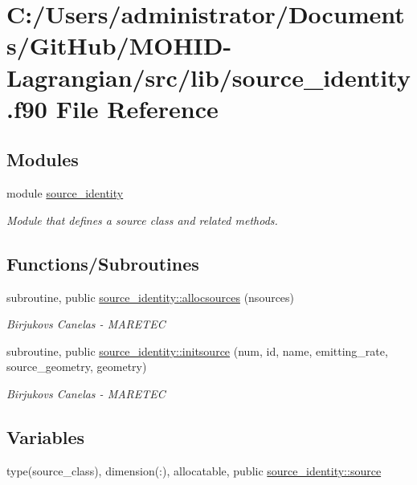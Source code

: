 \hypertarget{source__identity_8f90}{}\section{C\+:/\+Users/administrator/\+Documents/\+Git\+Hub/\+M\+O\+H\+I\+D-\/\+Lagrangian/src/lib/source\+\_\+identity.f90 File Reference}
\label{source__identity_8f90}
\subsection*{Modules}
\begin{DoxyCompactItemize}
\item 
module \mbox{\hyperlink{namespacesource__identity}{source\+\_\+identity}}
\begin{DoxyCompactList}\small\item\em Module that defines a source class and related methods. \end{DoxyCompactList}\end{DoxyCompactItemize}
\subsection*{Functions/\+Subroutines}
\begin{DoxyCompactItemize}
\item 
subroutine, public \mbox{\hyperlink{namespacesource__identity_a716b4cb4acec5756a6d4dcf20eee588e}{source\+\_\+identity\+::allocsources}} (nsources)
\begin{DoxyCompactList}\small\item\em Birjukovs Canelas -\/ M\+A\+R\+E\+T\+EC \end{DoxyCompactList}\item 
subroutine, public \mbox{\hyperlink{namespacesource__identity_a3939e59172252d0edce57e00ea41758d}{source\+\_\+identity\+::initsource}} (num, id, name, emitting\+\_\+rate, source\+\_\+geometry, geometry)
\begin{DoxyCompactList}\small\item\em Birjukovs Canelas -\/ M\+A\+R\+E\+T\+EC \end{DoxyCompactList}\end{DoxyCompactItemize}
\subsection*{Variables}
\begin{DoxyCompactItemize}
\item 
type(source\+\_\+class), dimension(\+:), allocatable, public \mbox{\hyperlink{namespacesource__identity_a5ed8006613af7461c6a2ff1cdaeb8f0f}{source\+\_\+identity\+::source}}
\end{DoxyCompactItemize}
